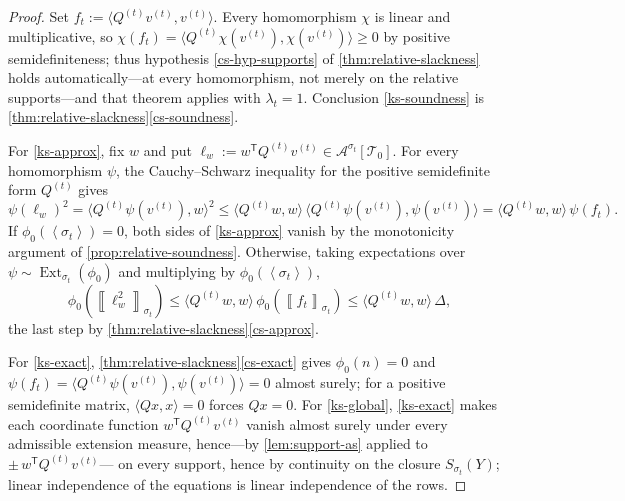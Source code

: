 \documentclass[11pt]{article}
\theoremstyle{definition}
\newcommand{\A}{\mathcal{A}}
\newcommand{\T}{\mathcal{T}}
\newcommand{\Ext}{\operatorname{Ext}}
\newcommand{\brak}[1]{\left\langle #1\right\rangle}
\newcommand{\avg}[2]{\left\llbracket #1 \right\rrbracket_{#2}}
\begin{document}
\begin{proof}
Set $f_t:=\langle Q^{(t)}v^{(t)},v^{(t)}\rangle$.  Every homomorphism $\chi$ is linear
and multiplicative, so
$\chi(f_t)=\langle Q^{(t)}\chi(v^{(t)}),\chi(v^{(t)})\rangle\ge0$ by positive
semidefiniteness; thus hypothesis \ref{cs-hyp-supports} of
\cref{thm:relative-slackness} holds automatically---at every homomorphism, not merely on
the relative supports---and that theorem applies with $\lambda_t=1$.  Conclusion
\ref{ks-soundness} is \cref{thm:relative-slackness}\ref{cs-soundness}.

For \ref{ks-approx}, fix $w$ and put $\ell_w:=w^{\mathsf T}Q^{(t)}v^{(t)}
\in\A^{\sigma_t}[\T_0]$.  For every homomorphism $\psi$, the Cauchy--Schwarz inequality
for the positive semidefinite form $Q^{(t)}$ gives
\[
  \psi(\ell_w)^2
  =\bigl\langle Q^{(t)}\psi(v^{(t)}),w\bigr\rangle^2
  \le
  \bigl\langle Q^{(t)}w,w\bigr\rangle\,
  \bigl\langle Q^{(t)}\psi(v^{(t)}),\psi(v^{(t)})\bigr\rangle
  =
  \bigl\langle Q^{(t)}w,w\bigr\rangle\,\psi(f_t).
\]
If $\phi_0(\brak{\sigma_t})=0$, both sides of \ref{ks-approx} vanish by the monotonicity
argument of \cref{prop:relative-soundness}.  Otherwise, taking expectations over
$\psi\sim\Ext_{\sigma_t}(\phi_0)$ and multiplying by $\phi_0(\brak{\sigma_t})$,
\[
  \phi_0(\avg{\ell_w^2}{\sigma_t})
  \le
  \bigl\langle Q^{(t)}w,w\bigr\rangle\,\phi_0(\avg{f_t}{\sigma_t})
  \le
  \bigl\langle Q^{(t)}w,w\bigr\rangle\,\Delta,
\]
the last step by \cref{thm:relative-slackness}\ref{cs-approx}.

For \ref{ks-exact}, \cref{thm:relative-slackness}\ref{cs-exact} gives $\phi_0(n)=0$ and
$\psi(f_t)=\langle Q^{(t)}\psi(v^{(t)}),\psi(v^{(t)})\rangle=0$ almost surely; for a
positive semidefinite matrix, $\langle Qx,x\rangle=0$ forces $Qx=0$.  For
\ref{ks-global}, \ref{ks-exact} makes each coordinate function
$w^{\mathsf T}Q^{(t)}v^{(t)}$ vanish almost surely under every admissible extension
measure, hence---by \cref{lem:support-as} applied to $\pm\,w^{\mathsf T}Q^{(t)}v^{(t)}$---%
on every support, hence by continuity on the closure $S_{\sigma_t}(Y)$; linear
independence of the equations is linear independence of the rows.
\end{proof}
\end{document}
